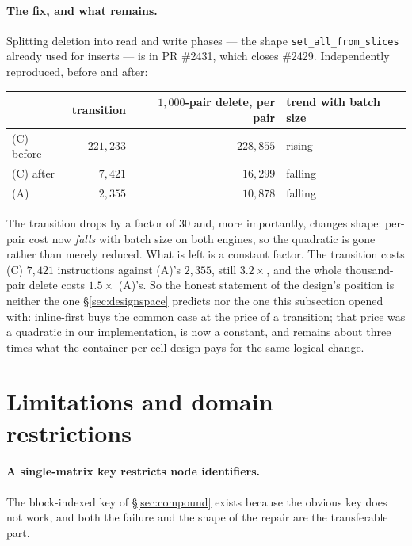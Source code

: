 \documentclass[11pt,a4paper]{article}
\theoremstyle{plain}
\theoremstyle{definition}
\theoremstyle{remark}
\begin{document}
\paragraph{The fix, and what remains.} Splitting deletion into read and write
phases --- the shape \texttt{set\_all\_from\_slices} already used for inserts ---
is in PR \#2431, which closes \#2429. Independently reproduced, before and
after:

\begin{center}
\small
\begin{tabular}{@{}lrrl@{}}
\toprule
 & transition & $1{,}000$-pair delete, per pair & trend with batch size \\
\midrule
(C) before & $221{,}233$ & $228{,}855$ & rising \\
(C) after  & $7{,}421$   & $16{,}299$  & falling \\
(A)        & $2{,}355$   & $10{,}878$  & falling \\
\bottomrule
\end{tabular}
\end{center}

\noindent
The transition drops by a factor of $30$ and, more importantly, changes shape:
per-pair cost now \emph{falls} with batch size on both engines, so the quadratic
is gone rather than merely reduced. What is left is a constant factor. The
transition costs (C) $7{,}421$ instructions against (A)'s $2{,}355$, still
$3.2\times$, and the whole thousand-pair delete costs $1.5\times$ (A)'s. So the
honest statement of the design's position is neither the one
\S\ref{sec:designspace} predicts nor the one this subsection opened with:
inline-first buys the common case at the price of a transition; that price was a
quadratic in our implementation, is now a constant, and remains about three
times what the container-per-cell design pays for the same logical change.

\section{Limitations and domain restrictions}
\label{sec:limits}

\paragraph{A single-matrix key restricts node identifiers.} The block-indexed
key of \S\ref{sec:compound} exists because the obvious key does not work, and
both the failure and the shape of the repair are the transferable part.
\end{document}
